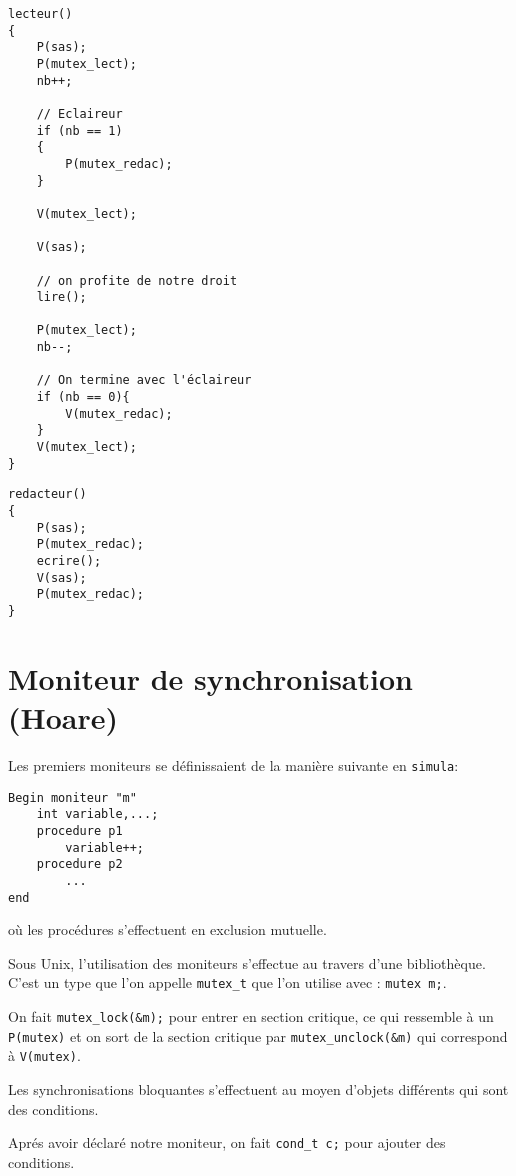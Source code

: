 \documentclass[12pt,a4paper]{report}
\begin{document}
\begin{minipage}{0.6\linewidth}
\begin{verbatim}
lecteur()
{
    P(sas);
    P(mutex_lect);
    nb++;

    // Eclaireur
    if (nb == 1)
    {
        P(mutex_redac);
    }

    V(mutex_lect);

    V(sas);

    // on profite de notre droit
    lire();

    P(mutex_lect);
    nb--;

    // On termine avec l'éclaireur
    if (nb == 0){
        V(mutex_redac);
    }
    V(mutex_lect);
}
\end{verbatim}
\end{minipage}
\begin{minipage}{0.4\linewidth}
\begin{verbatim}
redacteur()
{
    P(sas);
    P(mutex_redac);
    ecrire();
    V(sas);
    P(mutex_redac);
}
\end{verbatim}
\end{minipage}


\section{Moniteur de synchronisation (Hoare)}

Les premiers moniteurs se définissaient de la manière suivante en \texttt{simula}:

\begin{verbatim}
Begin moniteur "m"
    int variable,...;
    procedure p1
        variable++;
    procedure p2
        ...
end
\end{verbatim}

où les procédures s'effectuent en exclusion mutuelle.

Sous Unix, l'utilisation des moniteurs s'effectue au travers d'une bibliothèque. C'est un type que l'on appelle \verb?mutex_t? que l'on utilise avec : \verb?mutex m;?.

On fait \verb?mutex_lock(&m);? pour entrer en section critique, ce qui ressemble à un \verb?P(mutex)? et on sort de la section critique par \verb?mutex_unclock(&m)? qui correspond à \verb?V(mutex)?.

Les synchronisations bloquantes s'effectuent au moyen d'objets différents qui sont des \og conditions\fg{}.

Aprés avoir déclaré notre moniteur, on fait \verb?cond_t c;? pour ajouter des conditions.
\end{document}
